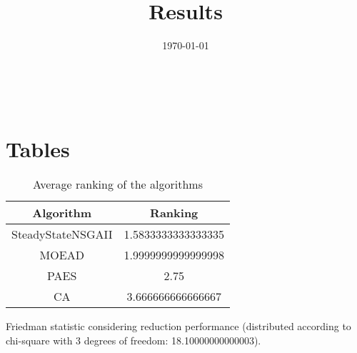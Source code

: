 \documentclass{article}
\title{Results}
\author{}
\date{\today}
\begin{document}
\oddsidemargin 0in \topmargin 0in\maketitle
\
\section{Tables}
\begin{table}[!htp]
\centering
\caption{Average ranking of the algorithms}
\begin{tabular}{c|c}
Algorithm&Ranking\\
\hline
SteadyStateNSGAII&1.5833333333333335\\
MOEAD&1.9999999999999998\\
PAES&2.75\\
CA&3.666666666666667\\
\end{tabular}
\end{table}


Friedman statistic considering reduction performance (distributed according to chi-square with 3 degrees of freedom: 18.10000000000003).
\end{document}

